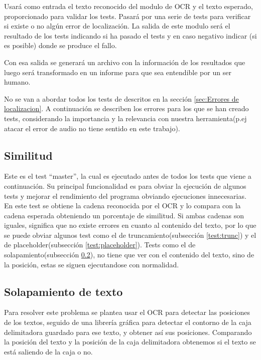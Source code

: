 Usará como entrada el texto reconocido del modulo de OCR y el texto esperado, proporcionado para validar los tests. Pasará por una serie de tests para verificar si existe o no algún error de localización. La salida de este modulo será el resultado de los tests indicando si ha pasado el tests y en caso negativo indicar (si es posible) donde se produce el fallo.

Con esa salida se generará un archivo con la información de los resultados que luego será transformado en un informe para que sea entendible por un ser humano.

No se van a abordar todos los tests de descritos en la sección \ref{sec:Errores de localizacion}. A continuación se describen los errores para los que se han creado tests,  considerando la importancia y la relevancia con nuestra herramienta(p.ej atacar el error de audio no tiene sentido en este trabajo).
\subsection{Similitud}
\label{test:Simi}
Este es el test ``master'', la cual es ejecutado antes de todos los tests que viene a continuación. Su principal funcionalidad es para obviar la ejecución de algunos tests y mejorar el rendimiento del programa obviando ejecuciones innecesarias. En este test se obtiene la cadena reconocida por el OCR y lo compara con la cadena esperada obteniendo un porcentaje de similitud. Si ambas cadenas son iguales, significa que no existe errores en cuanto al contenido del texto, por lo que se puede obviar algunos test como el de truncamiento(subsección \ref{test:trunc}) y el de placeholder(subsección \ref{test:placeholder}). Tests como el de solapamiento(subsección \ref{test:overlap}), no tiene que ver con el contenido del texto, sino de la posición, estas se siguen ejecutandose con normalidad.

\subsection{Solapamiento de texto}
\label{test:overlap}
Para resolver este problema se plantea usar el OCR para detectar las posiciones de los textos, seguido de una librería gráfica para detectar el contorno de la caja delimitadora guardado para ese texto, y obtener así sus posiciones. Comparando la posición del texto y la posición de la caja delimitadora obtenemos si el texto se está saliendo de la caja o no.

